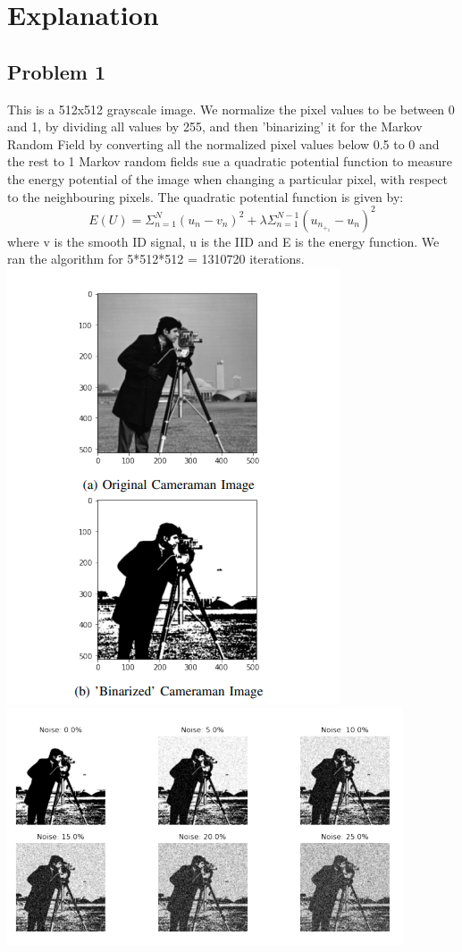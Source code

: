 \documentclass[conference]{IEEEtran}
\begin{document}
\section{Explanation}
\subsection{Problem 1}

This is a 512x512 grayscale image. We normalize the pixel
values to be between 0 and 1, by dividing all values by 255, and then ’binarizing’ it for the Markov Random Field by converting all the normalized pixel values below 0.5 to 0 and the rest to 1
Markov random fields sue a quadratic potential function to measure the energy potential of the image when changing a particular pixel, with respect to the neighbouring pixels.
The quadratic potential function is given by:
\begin{equation}
    E(U)= \Sigma_{n=1}^{N}(u_n-v_n)^2+ \lambda \Sigma_{n=1}^{N-1}(u_n_+_1 - u_n)^2 
\end{equation}
where v is the smooth ID signal, u is the IID and E is the energy function. We ran the algorithm for 5*512*512 = 1310720 iterations.
\includegraphics{Screenshot 2023-02-25 142025.png}
\includegraphics{Screenshot 2023-02-25 142052.png}
\end{document}
